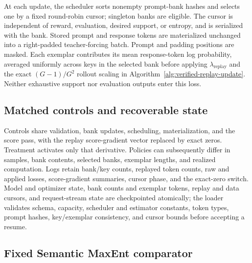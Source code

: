 \documentclass{article}
\newcommand{\1}{\mathbf 1}
\theoremstyle{remark}
\theoremstyle{definition}
\theoremstyle{plain}
\begin{document}
\label{app:algorithm-schedule}
At each update, the scheduler sorts nonempty prompt-bank hashes and selects
one by a fixed round-robin cursor; singleton banks are eligible. The cursor
is independent of reward, evaluation, desired support, or entropy, and is
serialized with the bank. Stored prompt and response tokens are
materialized unchanged into a right-padded teacher-forcing batch. Prompt
and padding positions are masked. Each exemplar contributes its mean
response-token log probability, averaged uniformly across keys in the
selected bank before applying $\lambda_{\mathrm{replay}}$ and the exact
$(G-1)/G^2$ rollout scaling in
Algorithm~\ref{alg:verified-replay-update}. Neither exhaustive support nor
evaluation outputs enter this loss.

\subsection{Matched controls and recoverable state}
\label{app:algorithm-control}

Controls share validation, bank updates, scheduling, materialization, and
the score pass, with the replay score-gradient vector replaced by exact
zeros. Treatment activates only that derivative. Policies can subsequently
differ in samples, bank contents, selected banks, exemplar lengths, and
realized computation. Logs retain bank/key counts, replayed token counts,
raw and applied losses, score-gradient summaries, cursor phase, and the
exact-zero switch. Model and optimizer state, bank counts and exemplar
tokens, replay and data cursors, and request-stream state are checkpointed
atomically; the loader validates schema, capacity, scheduler and estimator
constants, token types, prompt hashes, key/exemplar consistency, and cursor
bounds before accepting a resume.

\subsection{Fixed Semantic MaxEnt comparator}
\label{app:semantic-maxent}
\label{app:semantic-score}
\end{document}
